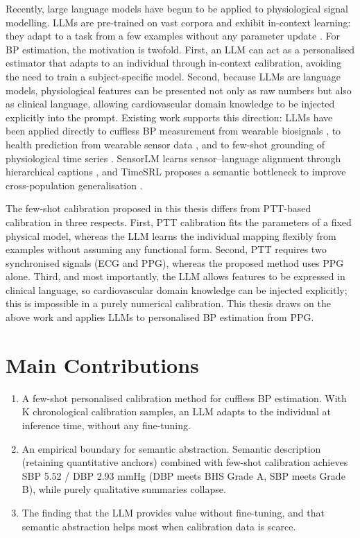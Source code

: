 Recently, large language models have begun to be applied to physiological signal modelling. LLMs are pre-trained on vast corpora and exhibit in-context learning: they adapt to a task from a few examples without any parameter update \citep{brown2020}. For BP estimation, the motivation is twofold. First, an LLM can act as a personalised estimator that adapts to an individual through in-context calibration, avoiding the need to train a subject-specific model. Second, because LLMs are language models, physiological features can be presented not only as raw numbers but also as clinical language, allowing cardiovascular domain knowledge to be injected explicitly into the prompt. Existing work supports this direction: LLMs have been applied directly to cuffless BP measurement from wearable biosignals \citep{llmbp2024}, to health prediction from wearable sensor data \citep{healthllm2024}, and to few-shot grounding of physiological time series \citep{fewshothealth2023}. SensorLM learns sensor--language alignment through hierarchical captions \citep{sensorlm2025}, and TimeSRL proposes a semantic bottleneck to improve cross-population generalisation \citep{timesrl2026}.

The few-shot calibration proposed in this thesis differs from PTT-based calibration in three respects. First, PTT calibration fits the parameters of a fixed physical model, whereas the LLM learns the individual mapping flexibly from examples without assuming any functional form. Second, PTT requires two synchronised signals (ECG and PPG), whereas the proposed method uses PPG alone. Third, and most importantly, the LLM allows features to be expressed in clinical language, so cardiovascular domain knowledge can be injected explicitly; this is impossible in a purely numerical calibration. This thesis draws on the above work and applies LLMs to personalised BP estimation from PPG.

\section{Main Contributions}

\begin{enumerate}
  \item A few-shot personalised calibration method for cuffless BP estimation. With K chronological calibration samples, an LLM adapts to the individual at inference time, without any fine-tuning.
  \item An empirical boundary for semantic abstraction. Semantic description (retaining quantitative anchors) combined with few-shot calibration achieves SBP 5.52 / DBP 2.93 mmHg (DBP meets BHS Grade A, SBP meets Grade B), while purely qualitative summaries collapse.
  \item The finding that the LLM provides value without fine-tuning, and that semantic abstraction helps most when calibration data is scarce.
\end{enumerate}

